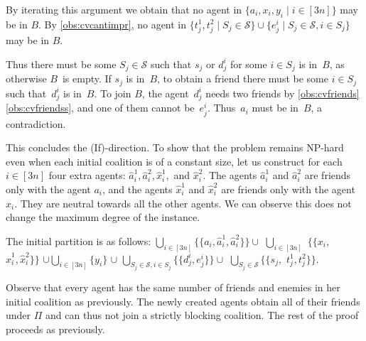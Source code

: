 \documentclass[a4paper,fleqn]{cas-sc}
\newcommand{\partition}{\ensuremath{\Pi}\xspace}
\newcommand{\blockingCoalition}{\ensuremath{B}\xspace}
\newcommand{\sets}{\ensuremath{\mathcal{S}}}
\newcommand{\elements}{\ensuremath{[3n]}}
\newcommand{\sset}[1]{\ensuremath{S_{#1}}}
\begin{document}
{By iterating this argument we obtain that no agent in $\{a_i, x_i, y_i \mid i \in \elements\}$ may be in \blockingCoalition.
By \cref{obs:cvcantimpr}, no agent in  $\{t^1_j, t^2_j \mid \sset j \in \sets\} \cup \{e^i_j \mid \sset j \in \sets, i \in \sset j\}$ may be in \blockingCoalition.

Thus there must be some $\sset j \in \sets$ such that $s_j$ or $d^i_j$ for some $i \in \sset j$ is in~\blockingCoalition, as otherwise \blockingCoalition\ is empty.
If $s_j$ is in~\blockingCoalition, to obtain a friend there must be some  $i \in \sset j$ such that~$d^i_j$ is in~\blockingCoalition.
To join \blockingCoalition, the agent~$d^i_j$ needs two friends by \cref{obs:cvfriends}\eqref{obs:cvfriendss}, and one of them cannot be~$e^i_j$. Thus~$a_i$ must be in~\blockingCoalition, a contradiction.

This concludes the (If)-direction.
To show that the problem remains NP-hard even when each initial coalition is of a constant size, let us construct for each $i \in \elements$ four extra agents: $\hat{a}^1_i, \hat{a}^2_i, \hat{x}^1_i,$ and $\hat{x}^2_i$.
The agents $\hat{a}^1_i$ and $\hat{a}^2_i$ are friends only with the agent $a_i$, and the agents $\hat{x}^1_i$ and $\hat{x}^2_i$ are friends only with the agent $x_i$. They are neutral towards all the other agents.
We can observe this does not change the maximum degree of the instance.

The initial partition is as follows: $\bigcup_{i \in \elements}\{\{a_i, \hat{a}^1_i, \hat{a}^2_i\}\} \cup$ $\bigcup_{i \in \elements}$ $\{\{x_i,$ $ \hat{x}^1_i, \hat{x}^2_i\}\}$ $\cup \bigcup_{i \in \elements} \{y_i\}$ $\cup$ $\bigcup_{\sset j \in \sets, i \in \sset j} \{\{d^i_j, e^i_j\}\} \cup$ $\bigcup_{\sset j \in \sets} \{\{s_j,$ $t^1_j, t^2_j\}\}$.

Observe that every agent has the same number of friends and enemies in her initial coalition as previously. The newly created agents obtain all of their friends under $\partition$ and can thus not join a strictly blocking coalition. The rest of the proof proceeds as previously.}
\end{document}
